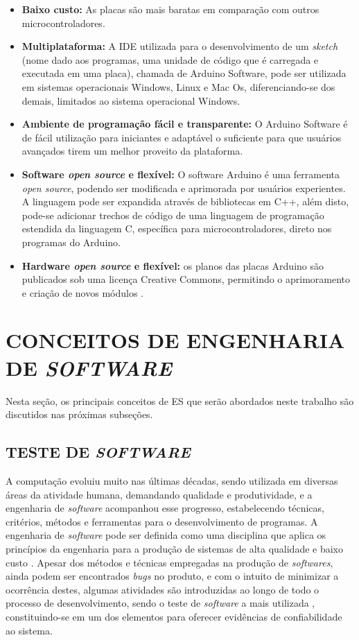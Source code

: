 \begin{itemize}
    \item \textbf{Baixo custo:} As placas são mais baratas em comparação com outros microcontroladores.
    \item \textbf{Multiplataforma:} A IDE utilizada para o desenvolvimento de um \textit{sketch} (nome dado aos programas, uma unidade de código que é carregada e executada em uma placa), chamada de Arduino Software, pode ser utilizada em sistemas operacionais Windows, Linux e Mac Os, diferenciando-se dos demais, limitados ao sistema operacional Windows.
    \item \textbf{ Ambiente de programação fácil e transparente:} O Arduino Software é de fácil utilização para iniciantes e adaptável o suficiente para que usuários avançados tirem um melhor proveito da plataforma.
    \item \textbf{Software \textit{open source} e flexível:} O software Arduino é uma ferramenta \textit{open source}, podendo ser modificada e aprimorada por usuários experientes. A linguagem pode ser expandida através de bibliotecas em C++, além disto, pode-se adicionar trechos de código de uma linguagem de programação estendida da linguagem C, específica para microcontroladores, direto nos programas do Arduino.
    
    \item \textbf{Hardware \textit{open source} e flexível:} os planos das placas Arduino são publicados sob uma licença Creative Commons, permitindo o aprimoramento e criação de novos módulos \cite{Arduino2018}.
\end{itemize}


\section{CONCEITOS DE ENGENHARIA DE \textit{SOFTWARE}}
\label{sec:engenhariaDeSoftware}
Nesta seção, os principais conceitos de ES que serão abordados neste trabalho são discutidos nas próximas subseções.

\subsection{TESTE DE \textit{SOFTWARE}}
\label{subsec:testeDeSoftware} A computação evoluiu muito nas últimas décadas, sendo utilizada em diversas áreas da atividade humana, demandando qualidade e produtividade, e a engenharia de \textit{software} acompanhou esse progresso, estabelecendo técnicas, critérios, métodos e ferramentas para o desenvolvimento de programas. A engenharia de \textit{software} pode ser definida como uma disciplina que aplica os princípios da engenharia para a produção de sistemas de alta qualidade e baixo custo \cite{Pressman2011}. Apesar dos métodos e técnicas empregadas na produção de \textit{softwares}, ainda podem ser encontrados \textit{bugs} no produto, e com o intuito de minimizar a ocorrência destes, algumas atividades são introduzidas ao longo de todo o processo de desenvolvimento, sendo o teste de \textit{software} a mais utilizada \cite{Maldonado1997}, constituindo-se em um dos elementos para oferecer evidências de confiabilidade ao sistema.

